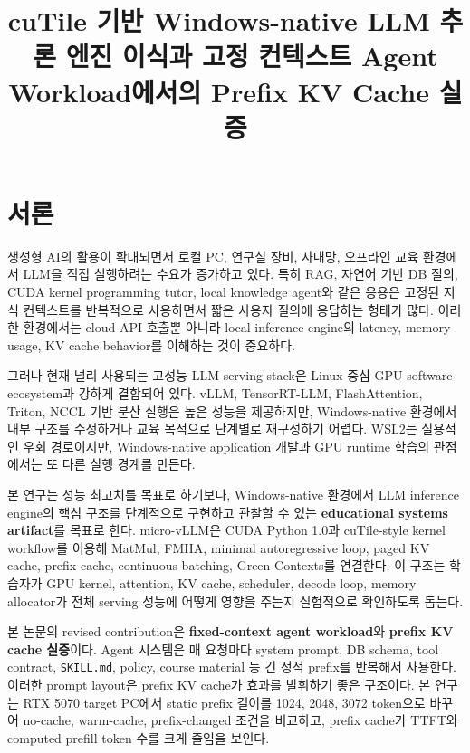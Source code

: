\documentclass{kcc}
\title{cuTile 기반 Windows-native LLM 추론 엔진 이식과 고정 컨텍스트 Agent Workload에서의 Prefix KV Cache 실증}
\author{}
\begin{document}
\maketitle

\section{서론}
생성형 AI의 활용이 확대되면서 로컬 PC, 연구실 장비, 사내망, 오프라인 교육 환경에서 LLM을 직접 실행하려는 수요가 증가하고 있다. 특히 RAG, 자연어 기반 DB 질의, CUDA kernel programming tutor, local knowledge agent와 같은 응용은 고정된 지식 컨텍스트를 반복적으로 사용하면서 짧은 사용자 질의에 응답하는 형태가 많다. 이러한 환경에서는 cloud API 호출뿐 아니라 local inference engine의 latency, memory usage, KV cache behavior를 이해하는 것이 중요하다.

그러나 현재 널리 사용되는 고성능 LLM serving stack은 Linux 중심 GPU software ecosystem과 강하게 결합되어 있다. vLLM, TensorRT-LLM, FlashAttention, Triton, NCCL 기반 분산 실행은 높은 성능을 제공하지만, Windows-native 환경에서 내부 구조를 수정하거나 교육 목적으로 단계별로 재구성하기 어렵다. WSL2는 실용적인 우회 경로이지만, Windows-native application 개발과 GPU runtime 학습의 관점에서는 또 다른 실행 경계를 만든다.

본 연구는 성능 최고치를 목표로 하기보다, Windows-native 환경에서 LLM inference engine의 핵심 구조를 단계적으로 구현하고 관찰할 수 있는 \textbf{educational systems artifact}를 목표로 한다. micro-vLLM은 CUDA Python 1.0과 cuTile-style kernel workflow를 이용해 MatMul, FMHA, minimal autoregressive loop, paged KV cache, prefix cache, continuous batching, Green Contexts를 연결한다. 이 구조는 학습자가 GPU kernel, attention, KV cache, scheduler, decode loop, memory allocator가 전체 serving 성능에 어떻게 영향을 주는지 실험적으로 확인하도록 돕는다.

본 논문의 revised contribution은 \textbf{fixed-context agent workload}와 \textbf{prefix KV cache 실증}이다. Agent 시스템은 매 요청마다 system prompt, DB schema, tool contract, \texttt{SKILL.md}, policy, course material 등 긴 정적 prefix를 반복해서 사용한다. 이러한 prompt layout은 prefix KV cache가 효과를 발휘하기 좋은 구조이다. 본 연구는 RTX 5070 target PC에서 static prefix 길이를 1024, 2048, 3072 token으로 바꾸어 no-cache, warm-cache, prefix-changed 조건을 비교하고, prefix cache가 TTFT와 computed prefill token 수를 크게 줄임을 보인다.
\end{document}
